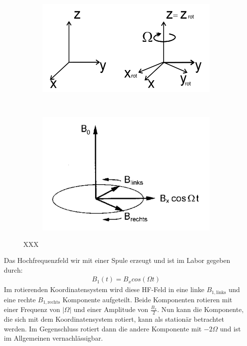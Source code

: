 \begin{figure}[hbtp]
\centering
	\begin{subfigure}[c]{0.4\textwidth}
	\includegraphics[width=\textwidth]{Plots/rotKoordinatensystem.png} 
	\subcaption{}
	\label{}
	\end{subfigure}
	~
	~
	\begin{subfigure}[c]{0.3\textwidth}
	\includegraphics[width=\textwidth]{Plots/B1Felder.png}
	\subcaption{}
	\label{}
	\end{subfigure}
\caption{XXX}
\label{rotKoordi}
\end{figure}

Das Hochfrequenzfeld wir mit einer Spule erzeugt und ist im Labor gegeben durch:
\begin{align}
	B_1(t) = B_x cos(\Omega t)
\end{align}
Im rotierenden Koordinatensystem wird diese HF-Feld in eine linke $B_{1,\text{links}}$ und eine rechte $B_{1,\text{rechts}}$ Komponente aufgeteilt.
Beide Komponenten rotieren mit einer Frequenz von $|\Omega|$ und einer Amplitude von $\frac{B_x}{2}$.
Nun kann die Komponente, die sich mit dem Koordinatensystem rotiert, kann als station\"{a}r betrachtet werden.
Im Gegenschluss rotiert dann die andere Komponente mit $-2\Omega$ und ist im Allgemeinen vernachl\"{a}ssigbar.

